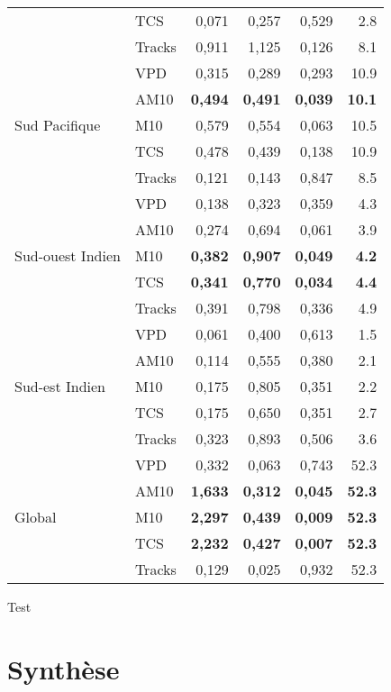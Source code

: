 \documentclass[../main.tex]{subfiles}
\begin{document}
\begin{table}[htpb]
\begin{adjustbox}{height=0.425\textheight}
\begin{tabular}{llrrrr}
     & TCS & 0,071 & 0,257 & 0,529 & 2.8 \\
     & Tracks & 0,911 & 1,125 & 0,126 & 8.1 \\
    \midrule
    \multirow[t]{5}{*}{Sud Pacifique} & VPD & 0,315 & 0,289 & 0,293 & 10.9 \\
     & AM10 & \textbf{0,494} & \textbf{0,491} & \textbf{0,039} & \textbf{10.1} \\
     & M10 & 0,579 & 0,554 & 0,063 & 10.5 \\
     & TCS & 0,478 & 0,439 & 0,138 & 10.9 \\
     & Tracks & 0,121 & 0,143 & 0,847 & 8.5 \\
    \midrule
    \multirow[t]{5}{*}{Sud-ouest Indien} & VPD & 0,138 & 0,323 & 0,359 & 4.3 \\
     & AM10 & 0,274 & 0,694 & 0,061 & 3.9 \\
     & M10 & \textbf{0,382} & \textbf{0,907} & \textbf{0,049} & \textbf{4.2} \\
     & TCS & \textbf{0,341} & \textbf{0,770} & \textbf{0,034} & \textbf{4.4} \\
     & Tracks & 0,391 & 0,798 & 0,336 & 4.9 \\
    \midrule
    \multirow[t]{5}{*}{Sud-est Indien} & VPD & 0,061 & 0,400 & 0,613 & 1.5 \\
     & AM10 & 0,114 & 0,555 & 0,380 & 2.1 \\
     & M10 & 0,175 & 0,805 & 0,351 & 2.2 \\
     & TCS & 0,175 & 0,650 & 0,351 & 2.7 \\
     & Tracks & 0,323 & 0,893 & 0,506 & 3.6 \\
    \midrule
    \multirow[t]{5}{*}{Global} & VPD & 0,332 & 0,063 & 0,743 & 52.3 \\
     & AM10 & \textbf{1,633} & \textbf{0,312} & \textbf{0,045} & \textbf{52.3} \\
     & M10 & \textbf{2,297} & \textbf{0,439} & \textbf{0,009} & \textbf{52.3} \\
     & TCS & \textbf{2,232} & \textbf{0,427} & \textbf{0,007} & \textbf{52.3} \\
     & Tracks & 0,129 & 0,025 & 0,932 & 52.3 \\
    \bottomrule
    \end{tabular}
\end{adjustbox}
\end{table}

Test

\section{Synthèse}
\end{document}
